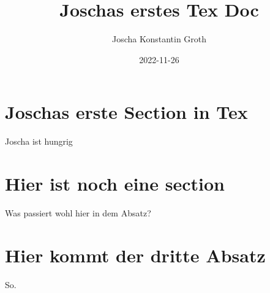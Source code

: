\documentclass[a4paper, 12pt]{article}
\title{Joschas erstes Tex Doc}
\author{Joscha Konstantin Groth}
\date{2022-11-26}
\begin{document}
\begin{titlepage}
    \maketitle
\end{titlepage}
\pagebreak
\tableofcontents
\pagebreak
\section{Joschas erste Section in Tex}
Joscha ist hungrig

\section{Hier ist noch eine section}
Was passiert wohl hier in dem Absatz?

\section{Hier kommt der dritte Absatz}
So.
\end{document}
